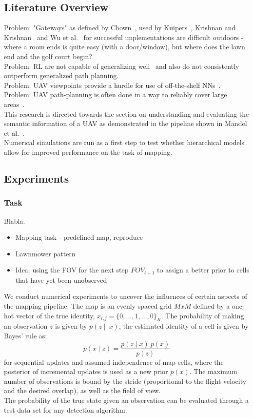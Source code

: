 \documentclass[twocolumn,letterpaper]{IEEEAerospaceCLS}  %
\begin{document}
\subsection{Literature Overview}
Problem: "Gateways" as defined by Chown~\cite{chown_prototypes_1995}, used by Kuipers~\cite{kuipers_local_2004}, Krishnan and Krishnan~\cite{krishnan_visual_2010} and Wu et al.~\cite{wu_learning_2018} for successful implementations are difficult outdoors - where a room ends is quite easy (with a door/window), but where does the lawn end and the golf court begin?\\
Problem: RL are not capable of generalizing well~\cite{chaplot_object_2020} and also do not consistently outperform generalized path planning.\\
Problem: UAV viewpoints provide a hurdle for use of off-the-shelf NNs~\cite{richardwebster_psyphy:_2019}.\\
Problem: UAV path-planning is often done in a way to reliably cover large areas~\cite{vanegas_novel_2018}.\\
This research is directed towards the section on understanding and evaluating the semantic information of a UAV as demonstrated in the pipeline shown in Mandel et al.~\cite{mandel_towards_2020}.\\
Numerical simulations are run as a first step to test whether hierarchical models allow for improved performance on the task of mapping.
\subsection{Experiments} \label{subsec:MetEx}
\subsubsection{Task}
Blabla.
\begin{itemize}
    \item Mapping task - predefined map, reproduce
    \item Lawnmower pattern
    \item Idea: using the FOV for the next step $FOV_{t+1}$ to assign a better prior to cells that have yet been unobserved
\end{itemize}
We conduct numerical experiments to uncover the influences of certain aspects of the mapping pipeline. The map is an evenly spaced grid $MxM$ defined by a one-hot vector of the true identity, $x_{i,j} = \{0,..., 1, ..., 0\}_K$. The probability of making an observation $z$ is given by $p(z\mid~x)$, the estimated identity of a cell is given by Bayes' rule as:
\begin{equation}
    p(x \mid z) = \frac{p(z \mid x)~p(x)}{p(z)}
\end{equation}
for sequential updates and assumed independence of map cells, where the posterior of incremental updates is used as a new prior $p(x)$. The maximum number of observations is bound by the stride (proportional to the flight velocity and the desired overlap), as well as the field of view.\\
The probability of the true state given an observation can be evaluated through a test data set for any detection algorithm.
\end{document}
